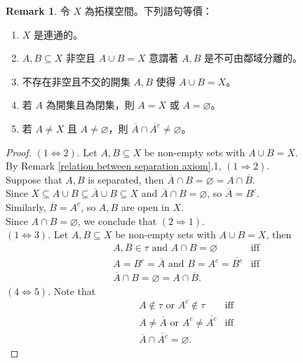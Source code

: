 \documentclass[12pt]{article}
\theoremstyle{definition}
\newtheorem{remark}[definition]{Remark}
\newcommand\<{\langle}
\renewcommand\>{\rangle}
\begin{document}
\begin{CJK}{UTF8}{bsmi}
\begin{remark}
    令 $X$ 為拓樸空間。下列語句等價：
    \begin{enumerate}
        \item $X$ 是連通的。
        \item $A, B\subseteq X$ 非空且 $A\cup B=X$ 意謂著 $A, B$ 是不可由鄰域分離的。
        \item 不存在非空且不交的開集 $A, B$ 使得 $A\cup B=X$。
        \item 若 $A$ 為開集且為閉集，則 $A=X$ 或 $A=\varnothing$。
        \item 若 $A\ne X$ 且 $A\ne\varnothing$，則 $\overline{A}\cap\overline{A^c}\ne\varnothing$。
    \end{enumerate}
\end{remark}
\begin{proof}
    $(1\Leftrightarrow2)$. Let $A, B\subseteq X$ be non-empty sets with $A\cup B=X$. \\
    By Remark \ref{relation between separation axiom}.1, $(1\Rightarrow2)$. \\
    Suppose that $A, B$ is separated, then $\overline{A}\cap B=\varnothing=A\cap\overline{B}$. \\
    Since $X\subseteq A\cup B\subseteq\overline{A}\cup B\subseteq X$ and $\overline{A}\cap B=\varnothing$, so $\overline{A}=B^c$. \\
    Similarly, $\overline{B}=A^c$, so $A, B$ are open in $X$. \\
    Since $A\cap B=\varnothing$, we conclude that $(2\Rightarrow1)$. \\
    $(1\Leftrightarrow3)$. Let $A, B\subseteq X$ be non-empty sets with $A\cup B=X$, then
    \begin{align*}
        & A, B\in\tau\text{ and }A\cap B=\varnothing
        & \text{iff} \\
        & A=B^c=\overline{A}\text{ and }B=A^c=\overline{B^c}
        & \text{iff} \\
        & \overline{A}\cap B=\varnothing=A\cap\overline{B}.
    \end{align*}
    $(4\Leftrightarrow5)$. Note that
    \begin{align*}
        & A\notin\tau\text{ or }A^c\notin\tau 
        & \text{iff} \\
        & A\ne\overline{A}\text{ or }A^c\ne\overline{A^c}
        & \text{iff} \\
        & \overline{A}\cap\overline{A^c}=\varnothing.
    \end{align*}
\end{proof}


\end{CJK}
\end{document}
